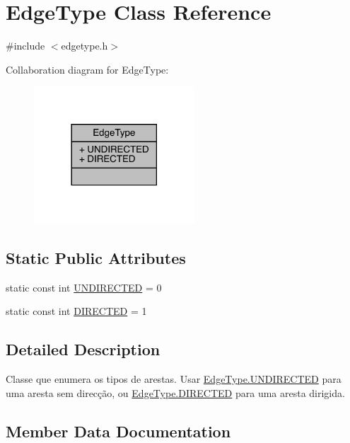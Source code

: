 \hypertarget{class_edge_type}{}\section{Edge\+Type Class Reference}
\label{class_edge_type}


{\ttfamily \#include $<$edgetype.\+h$>$}



Collaboration diagram for Edge\+Type\+:
\nopagebreak
\begin{figure}[H]
\begin{center}
\leavevmode
\includegraphics[width=170pt]{class_edge_type__coll__graph}
\end{center}
\end{figure}
\subsection*{Static Public Attributes}
\begin{DoxyCompactItemize}
\item 
static const int \hyperlink{class_edge_type_a6533cc56d05c288a550b9980b66c9317}{U\+N\+D\+I\+R\+E\+C\+T\+ED} = 0
\item 
static const int \hyperlink{class_edge_type_a903017a534f2818c2d17145e4ae0321c}{D\+I\+R\+E\+C\+T\+ED} = 1
\end{DoxyCompactItemize}


\subsection{Detailed Description}
Classe que enumera os tipos de arestas. Usar \hyperlink{class_edge_type_a6533cc56d05c288a550b9980b66c9317}{Edge\+Type.\+U\+N\+D\+I\+R\+E\+C\+T\+ED} para uma aresta sem direcção, ou \hyperlink{class_edge_type_a903017a534f2818c2d17145e4ae0321c}{Edge\+Type.\+D\+I\+R\+E\+C\+T\+ED} para uma aresta dirigida. 

\subsection{Member Data Documentation}
\hypertarget{class_edge_type_a903017a534f2818c2d17145e4ae0321c}{}\label{class_edge_type_a903017a534f2818c2d17145e4ae0321c} 
